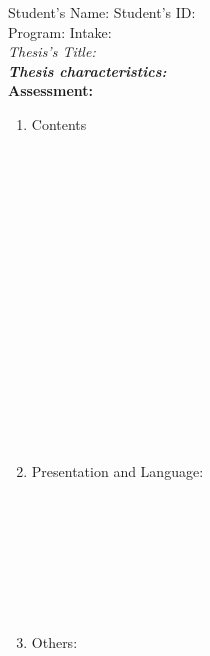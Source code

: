 \noindent Student's Name: \dotfill \hspace{1cm} Student's ID: \dotfill \\
Program: \dotfill \hspace{1cm} Intake: \dotfill \\
\textit{Thesis's Title:} \dotfill \\
\noindent\textbf{\textit{Thesis characteristics:}} \dotfill \\
\textbf{Assessment:}
\begin{enumerate}[leftmargin=1.5cm]
    \item Contents \\
    \makebox[\textwidth]{\dotfill} \\
    \makebox[\textwidth]{\dotfill} \\
    \makebox[\textwidth]{\dotfill} \\
    \makebox[\textwidth]{\dotfill} \\
    \makebox[\textwidth]{\dotfill} \\
    \makebox[\textwidth]{\dotfill} \\
    \makebox[\textwidth]{\dotfill} \\
    \makebox[\textwidth]{\dotfill} \\
    \makebox[\textwidth]{\dotfill} \\
    \makebox[\textwidth]{\dotfill} \\
    \makebox[\textwidth]{\dotfill} \\
    \makebox[\textwidth]{\dotfill} \\
    \makebox[\textwidth]{\dotfill} \\
    \makebox[\textwidth]{\dotfill} \\
    \makebox[\textwidth]{\dotfill} \\
    \makebox[\textwidth]{\dotfill} \\
    \item Presentation and Language: \\
    \makebox[\textwidth]{\dotfill} \\
    \makebox[\textwidth]{\dotfill} \\
    \makebox[\textwidth]{\dotfill} \\
    \makebox[\textwidth]{\dotfill} \\
    \makebox[\textwidth]{\dotfill} \\
    \makebox[\textwidth]{\dotfill} \\
    \makebox[\textwidth]{\dotfill} \\
    \item Others: \\
    \makebox[\textwidth]{\dotfill} \\
    \makebox[\textwidth]{\dotfill} \\
    \makebox[\textwidth]{\dotfill} \\
    \makebox[\textwidth]{\dotfill} \\
    \makebox[\textwidth]{\dotfill} \\
    \makebox[\textwidth]{\dotfill} \\
    \makebox[\textwidth]{\dotfill} \\
\end{enumerate}

